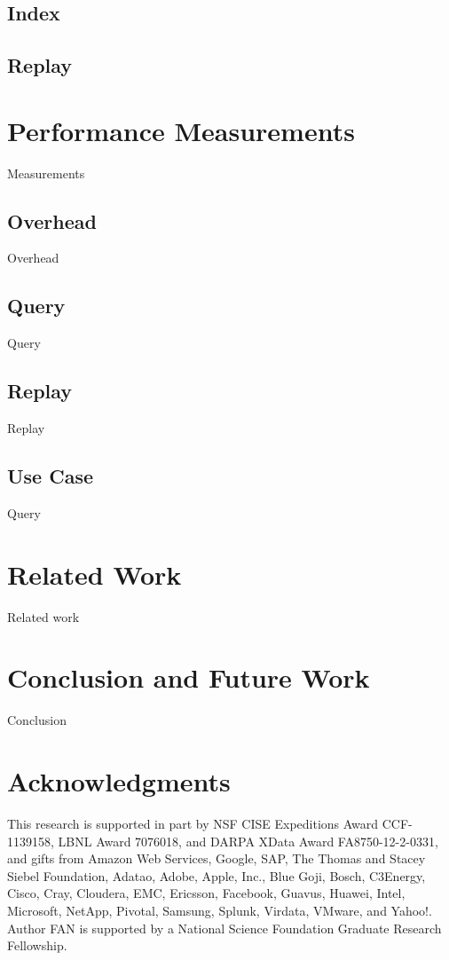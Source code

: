 \documentclass{sig-alternate}
\begin{document}
\subsection{Index}

\subsection{Replay}

\section{Performance Measurements}
\label{sec:Perf}
Measurements

\subsection{Overhead}
Overhead

\subsection{Query}
Query

\subsection{Replay}
Replay

\subsection{Use Case}
Query

\section{Related Work}
\label{sec:Related}
Related work

\section{Conclusion and Future Work}
\label{sec:Conclusion}
Conclusion

\section{Acknowledgments}
This research is supported in part by NSF CISE Expeditions Award CCF-1139158, LBNL Award 7076018, and DARPA XData Award FA8750-12-2-0331, and gifts from Amazon Web Services, Google, SAP,  The Thomas and Stacey Siebel Foundation, Adatao, Adobe, Apple, Inc., Blue Goji, Bosch, C3Energy, Cisco, Cray, Cloudera, EMC, Ericsson, Facebook, Guavus, Huawei, Intel, Microsoft, NetApp, Pivotal, Samsung, Splunk, Virdata, VMware, and Yahoo!. Author FAN is supported by a National Science Foundation Graduate Research Fellowship.
\end{document}
